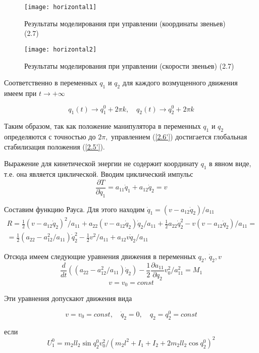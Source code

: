 \begin{figure}[h]
	\centering
	\texttt{[image: horizontal1]}
	\caption{Результаты моделирования при управлении (координаты звеньев) (2.7)}
	\label{fig:manip_horizontal1}
\end{figure}

\begin{figure}[h]
	\centering
	\texttt{[image: horizontal2]}
	\caption{Результаты моделирования при управлении (скорости звеньев) (2.7)}
	\label{fig:manip_horizontal2}
\end{figure}

Соответственно в переменных $q_1$ и $q_2$ для каждого возмущенного движения имеем при $t \to +\infty$ 

\begin{equation}
q_1 (t) \to q_1^0 + 2 \pi k, \quad q_2(t) \to q_2^0 + 2 \pi k
\end{equation}


Таким образом, так как положение манипулятора в переменных $q_1$ и $q_2$ определяются с точностью до $2 \pi,$ управлением (\ref{2.6'}) достигается глобальная стабилизация положения (\ref{2.5'}).

Выражение для кинетической энергии не содержит координату $q_1$ в явном виде, т.е. она является циклической. Вводим циклический импульс $$\frac{\partial T}{\partial \dot q_1} = a_{11} \dot q_1 + a_{12} \dot q_2 = v$$

Составим функцию Рауса. Для этого находим $\dot q_1 = (v - a_12 \dot q_2) / a_{11}$
$$
\begin{array}{c}
\displaystyle R = \frac12 (v - a_{12} \dot q_2)^2 / a_{11} + a_{22} (v - a_{12} \dot q_2) \dot q_2 / a_{11} + \frac12 a_{22} \dot q_2^2 - v (v - a_{12} \dot q_2) / a_{11} =\\
\displaystyle = \frac12 (a_{22} - a_{12}^2 / a_{11}) \dot q_2^2 - \frac12 v^2 / a_{11} + a_{12} v \dot q_2 / a_{11}
\end{array}
$$

Отсюда имеем следующие уравнения движения в переменных $q_2, \ \dot q_2, v$
$$\frac{d}{dt} ((a_{22} - a_{12}^2 / a_{11}) \dot q_2) - \frac12 \frac{\partial a_{11}}{\partial q_2} v_0^2 / a_{11}^2 = M_1$$
$$v = v_0 = const$$

Эти уравнения допускают движения вида 

\begin{equation}
v = v_0 = const, \quad \dot q_2 = 0, \quad q_2 = q_2^0 = const
\end{equation}

если 
$$U_1^0 = m_2 l l_2 \sin q_2^0 v_0^2 / (m_2 l^2 + I_1 + I_2 + 2 m_2 l l_2 \cos q_2^0)^2$$

